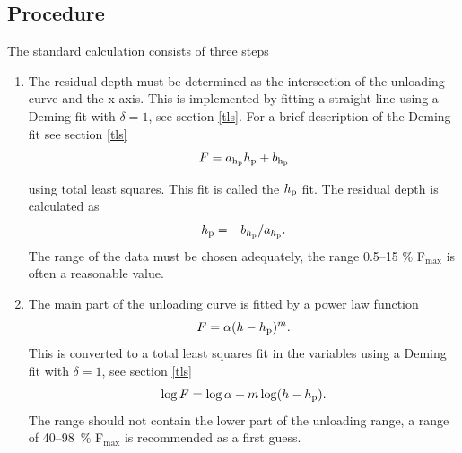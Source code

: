 \subsection{Procedure}\label{op_calc}
The standard calculation consists of three steps
\begin{enumerate}
 \item  The residual depth must be determined as the intersection of the unloading curve and the x-axis.
This is implemented by fitting a straight line using a Deming fit with $\delta = 1$, see section \ref{tls}. 
For a brief description of the Deming fit see section \ref{tls}
\begin{equation}
F = a_\mathrm{h_\mathrm{p}} h_\mathrm{p} + b_\mathrm{h_{p}} \label{eq:hp-fit}
\end{equation}

using total least squares. This fit is called the $h_\mathrm{p}$ fit. The residual depth is calculated as 
\begin{equation} \label{eq:hp}
 h_\mathrm{p} = -b_{h_\mathrm{p}}/a_{h_\mathrm{p}}. 
\end{equation}
The range of the data must be chosen adequately, the range 0.5--15 \% F$_\mathrm{max}$ is often a reasonable value. \\

\item The main part of the unloading curve is fitted by a power law function
\begin{equation}
F = \alpha (h - h_\mathrm{p})^m.
\end{equation}
This is converted to a total least squares fit in the variables using a Deming fit with $\delta =1 $, see section \ref{tls}
\begin{equation}
\log F = \log \alpha + m \log (h- h_\mathrm{p}). \label{eq:m-fit}
\end{equation}
The range should not contain the lower part of the unloading range, a range of 40--98~\% F$_\mathrm{max}$ is recommended as a first guess.


\end{enumerate}
